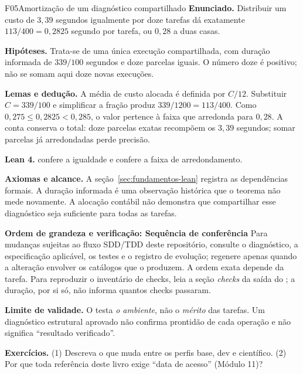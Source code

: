 \begin{formalizacao}{F05}{Amortização de um diagnóstico compartilhado}
\textbf{Enunciado.} Distribuir um custo de $3{,}39$ segundos igualmente por doze tarefas dá exatamente $113/400=0{,}2825$ segundo por tarefa, ou $0{,}28$ a duas casas.

\textbf{Hipóteses.} Trata-se de uma única execução compartilhada, com duração informada de $339/100$ segundos e doze parcelas iguais. O número doze é positivo; não se somam aqui doze novas execuções.

\textbf{Lemas e dedução.} A média de custo alocada é definida por $C/12$. Substituir $C=339/100$ e simplificar a fração produz $339/1200=113/400$. Como $0{,}275\leq0{,}2825<0{,}285$, o valor pertence à faixa que arredonda para $0{,}28$. A conta conserva o total: doze parcelas exatas recompõem os $3{,}39$ segundos; somar parcelas já arredondadas perde precisão.

\textbf{Lean 4.}  confere a igualdade e  confere a faixa de arredondamento.

\textbf{Axiomas e alcance.} A seção~\ref{sec:fundamentos-lean} registra as dependências formais. A duração informada é uma observação histórica que o teorema não mede novamente. A alocação contábil não demonstra que compartilhar esse diagnóstico seja suficiente para todas as tarefas.
\end{formalizacao}

\begin{resultado}
\textbf{Ordem de grandeza e verificação: Sequência de conferência} Para mudanças sujeitas ao fluxo SDD/TDD deste
repositório, consulte o diagnóstico, a especificação aplicável, os testes e o
registro de evolução; regenere  apenas quando a alteração
envolver os catálogos que o produzem. A ordem exata depende da tarefa. Para
reproduzir o inventário de checks, leia a seção \emph{checks} da saída do
; a duração, por si só, não informa quantos checks passaram.
\end{resultado}

\begin{aviso}
\textbf{Limite de validade.} O  testa \emph{o ambiente}, não o
\emph{mérito} das tarefas. Um diagnóstico estrutural aprovado não confirma prontidão de cada operação e não significa
``resultado verificado''.
\end{aviso}

\begin{resultado}
\textbf{Exercícios.} (1) Descreva o que muda entre os perfis base, dev e
científico. (2) Por que toda referência deste livro exige ``data de acesso''
(Módulo 11)?
\end{resultado}

